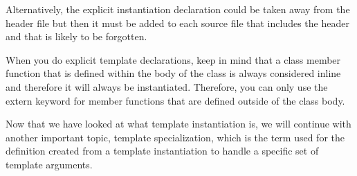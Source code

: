 Alternatively, the explicit instantiation declaration could be taken away from the header file but then it must be added to each source file that includes the header and that is likely to be forgotten.

When you do explicit template declarations, keep in mind that a class member function that is defined within the body of the class is always considered inline and therefore it will always be instantiated. Therefore, you can only use the extern keyword for member functions that are defined outside of the class body.

Now that we have looked at what template instantiation is, we will continue with another important topic, template specialization, which is the term used for the definition created from a template instantiation to handle a specific set of template arguments.















